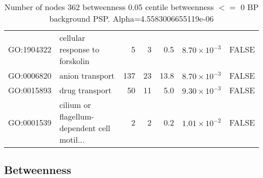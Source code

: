\begin{table}[ht]
\begin{adjustbox}{max width=\textwidth}
\begin{tabular}{llrrrrl}
  GO:1904322 & cellular response to forskolin & 5 & 3 & 0.5 & $8.70 \times 10^{-3}$ & FALSE \\ 
  GO:0006820 & anion transport & 137 & 23 & 13.8 & $8.70 \times 10^{-3}$ & FALSE \\ 
  GO:0015893 & drug transport & 50 & 11 & 5.0 & $9.30 \times 10^{-3}$ & FALSE \\ 
  GO:0001539 & cilium or flagellum-dependent cell motil... & 2 & 2 & 0.2 & $1.01 \times 10^{-2}$ & FALSE \\ 
   \hline
\end{tabular}
\end{adjustbox}
\caption{Number of nodes 362 betweenness 0.05 centile  betweenness $<=$ 0 BP background PSP. Alpha=4.5583006655119e-06} 
\label{tab:Number of nodes 362 betweenness 0.05 centile  betweenness $<=$ 0 BP background PSP. Alpha=4.5583006655119e-06}
\end{table}



\subsection{Betweenness}


